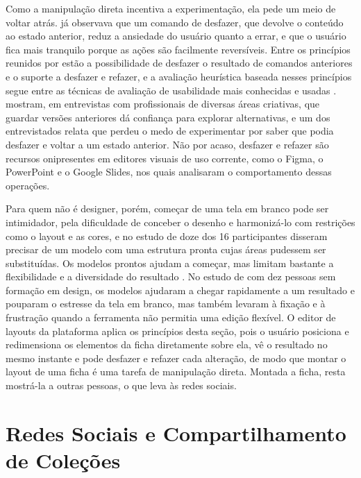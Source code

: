 Como a manipulação direta incentiva a experimentação, ela pede um meio de voltar atrás.  já observava que um comando de
desfazer, que devolve o conteúdo ao estado anterior, reduz a ansiedade do usuário quanto a errar, e que o usuário fica mais tranquilo porque as ações são
facilmente reversíveis. Entre os princípios reunidos por  estão a possibilidade de desfazer o
resultado de comandos anteriores e o suporte a desfazer e refazer, e a avaliação heurística baseada nesses princípios segue entre as técnicas de avaliação de
usabilidade mais conhecidas e usadas \cite{Pascual2024}.  mostram, em entrevistas com profissionais de
diversas áreas criativas, que guardar versões anteriores dá confiança para explorar alternativas, e um dos entrevistados relata que perdeu o medo de
experimentar por saber que podia desfazer e voltar a um estado anterior. Não por acaso, desfazer e refazer são recursos onipresentes em editores visuais de
uso corrente, como o Figma, o PowerPoint e o Google Slides, nos quais  analisaram o comportamento dessas operações.

Para quem não é designer, porém, começar de uma tela em branco pode ser intimidador, pela dificuldade de conceber o desenho e harmonizá-lo com restrições como
o layout e as cores, e no estudo de  doze dos 16 participantes disseram precisar de um modelo com uma estrutura pronta cujas áreas
pudessem ser substituídas. Os modelos prontos ajudam a começar, mas limitam bastante a flexibilidade e a diversidade do resultado \cite{Hsu2023}. No estudo de
 com dez pessoas sem formação em design, os modelos ajudaram a chegar rapidamente a um resultado e pouparam o estresse da tela em
branco, mas também levaram à fixação e à frustração quando a ferramenta não permitia uma edição flexível. O editor de layouts da plataforma aplica os
princípios desta seção, pois o usuário posiciona e redimensiona os elementos da ficha diretamente sobre ela, vê o
resultado no mesmo instante e pode desfazer e refazer cada alteração, de modo que montar o layout de uma ficha é uma tarefa de manipulação direta. Montada a
ficha, resta mostrá-la a outras pessoas, o que leva às redes sociais.


\section{Redes Sociais e Compartilhamento de Coleções}
\label{sec:redes-sociais}

